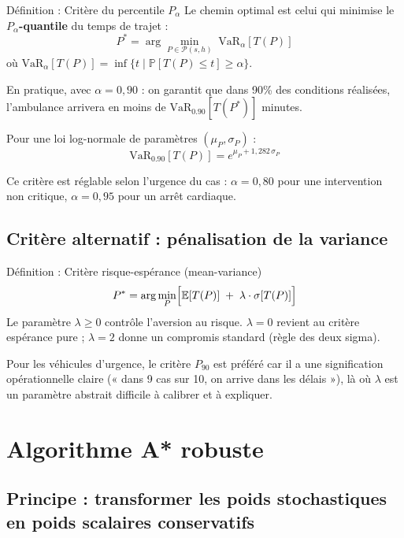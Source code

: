 \documentclass[12pt,a4paper]{article}
\theoremstyle{definition}
\theoremstyle{remark}
\begin{document}
\begin{defbox}{Définition : Critère du percentile $P_\alpha$}
Le chemin optimal est celui qui minimise le \textbf{$P_\alpha$-quantile}
du temps de trajet :
\[
  P^* = \arg\min_{P \in \mathcal{P}(s,h)} \;
  \text{VaR}_\alpha[T(P)]
\]
où $\text{VaR}_\alpha[T(P)] = \inf\{t \mid \mathbb{P}[T(P) \leq t] \geq \alpha\}$.

En pratique, avec $\alpha = 0{,}90$ : on garantit que dans 90\%
des conditions réalisées, l'ambulance arrivera en moins de
$\text{VaR}_{0.90}[T(P^*)]$ minutes.
\end{defbox}

Pour une loi log-normale de paramètres $(\mu_P, \sigma_P)$ :
\[
  \text{VaR}_{0.90}[T(P)] = e^{\mu_P + 1{,}282\,\sigma_P}
\]

Ce critère est réglable selon l'urgence du cas : $\alpha = 0{,}80$
pour une intervention non critique, $\alpha = 0{,}95$ pour un arrêt
cardiaque.

\subsection{Critère alternatif : pénalisation de la variance}

\begin{defbox}{Définition : Critère risque-espérance (mean-variance)}
\[
  P^* = \arg\min_{P} \Bigl[
    \mathbb{E}[T(P)] \;+\; \lambda \cdot \sigma[T(P)]
  \Bigr]
\]
Le paramètre $\lambda \geq 0$ contrôle l'aversion au risque.
$\lambda = 0$ revient au critère espérance pure ; $\lambda = 2$
donne un compromis standard (règle des deux sigma).
\end{defbox}

Pour les véhicules d'urgence, le critère $P_{90}$ est préféré car
il a une signification opérationnelle claire (« dans 9 cas sur 10,
on arrive dans les délais »), là où $\lambda$ est un paramètre
abstrait difficile à calibrer et à expliquer.

\newpage

\section{Algorithme A* robuste}
\label{sec:astar_robuste}

\subsection{Principe : transformer les poids stochastiques en poids scalaires conservatifs}
\end{document}
